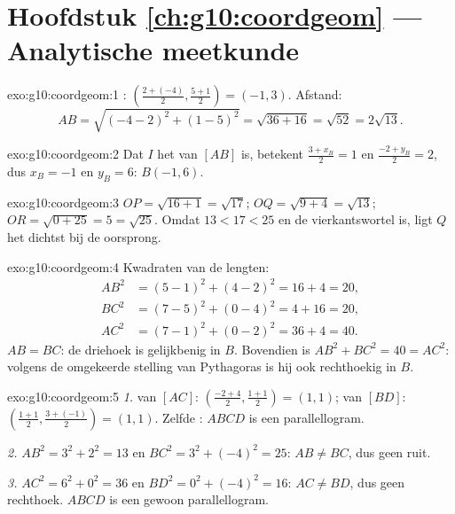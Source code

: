 \section*{Hoofdstuk \ref{ch:g10:coordgeom} --- Analytische meetkunde}

\begin{solution}{exo:g10:coordgeom:1}
: $\left(\frac{2 + (-4)}{2}, \frac{5 + 1}{2}\right) = (-1, 3)$.
Afstand:
\[
AB = \sqrt{(-4 - 2)^2 + (1 - 5)^2} = \sqrt{36 + 16} = \sqrt{52}
= 2\sqrt{13}.
\]
\end{solution}

\begin{solution}{exo:g10:coordgeom:2}
Dat $I$ het  van $[AB]$ is, betekent $\frac{3 + x_B}{2} = 1$ en
$\frac{-2 + y_B}{2} = 2$, dus $x_B = -1$ en $y_B = 6$: $B(-1, 6)$.
\end{solution}

\begin{solution}{exo:g10:coordgeom:3}
$OP = \sqrt{16 + 1} = \sqrt{17}$; $OQ = \sqrt{9 + 4} = \sqrt{13}$;
$OR = \sqrt{0 + 25} = 5 = \sqrt{25}$. Omdat $13 < 17 < 25$ en de
vierkantswortel  is, ligt $Q$ het dichtst bij de oorsprong.
\end{solution}

\begin{solution}{exo:g10:coordgeom:4}
Kwadraten van de lengten:
\begin{align*}
AB^2 &= (5-1)^2 + (4-2)^2 = 16 + 4 = 20, \\
BC^2 &= (7-5)^2 + (0-4)^2 = 4 + 16 = 20, \\
AC^2 &= (7-1)^2 + (0-2)^2 = 36 + 4 = 40 .
\end{align*}
$AB = BC$: de driehoek is gelijkbenig in $B$. Bovendien is
$AB^2 + BC^2 = 40 = AC^2$: volgens de omgekeerde stelling van Pythagoras is
hij ook rechthoekig in $B$.
\end{solution}

\begin{solution}{exo:g10:coordgeom:5}
\emph{1.}  van $[AC]$: $\left(\frac{-2+4}{2}, \frac{1+1}{2}\right) =
(1, 1)$;  van $[BD]$: $\left(\frac{1+1}{2},
\frac{3+(-1)}{2}\right) = (1, 1)$. Zelfde : $ABCD$ is een
parallellogram.

\emph{2.} $AB^2 = 3^2 + 2^2 = 13$ en $BC^2 = 3^2 + (-4)^2 = 25$:
$AB \neq BC$, dus geen ruit.

\emph{3.} $AC^2 = 6^2 + 0^2 = 36$ en $BD^2 = 0^2 + (-4)^2 = 16$:
$AC \neq BD$, dus geen rechthoek. $ABCD$ is een gewoon parallellogram.
\end{solution}

